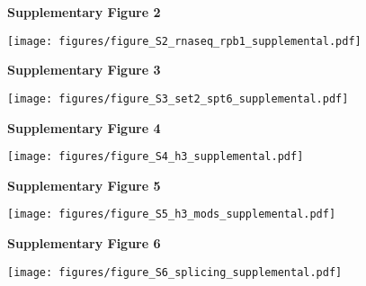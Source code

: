 \documentclass[9pt, letterpaper]{extarticle}
\begin{document}
\newpage

\textbf{\large Supplementary Figure 2}

{\centering \texttt{[image: figures/figure\_S2\_rnaseq\_rpb1\_supplemental.pdf]}\par}

\newpage

\textbf{\large Supplementary Figure 3}

{\centering \texttt{[image: figures/figure\_S3\_set2\_spt6\_supplemental.pdf]}\par}

\newpage

\textbf{\large Supplementary Figure 4}

{\centering \texttt{[image: figures/figure\_S4\_h3\_supplemental.pdf]}\par}

\newpage

\textbf{\large Supplementary Figure 5}

{\centering \texttt{[image: figures/figure\_S5\_h3\_mods\_supplemental.pdf]}\par}

\newpage

\textbf{\large Supplementary Figure 6}

{\centering \texttt{[image: figures/figure\_S6\_splicing\_supplemental.pdf]}\par}

\newpage
\end{document}

